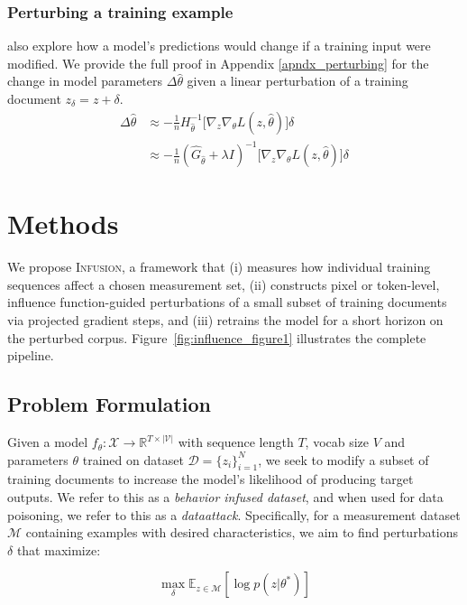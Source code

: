 \documentclass{article}
\theoremstyle{plain}
\theoremstyle{definition}
\theoremstyle{remark}
\begin{document}
\subsubsection{Perturbing a training example}
\citet{koh2017understanding} also explore how a model's predictions would change if a training input were modified. We provide the full proof in Appendix \ref{apndx_perturbing} for the change in model parameters $\Delta \hat \theta$ given a linear perturbation of a training document $z_\delta = z + \delta $.
\begin{align}
\Delta\hat\theta &\approx -\frac{1}{n} H_{\hat{\theta}}^{-1} \big[ \nabla_z \nabla_\theta L(z, \hat\theta)\big]\delta \\
&\approx -\frac{1}{n} (\hat G_{\hat\theta} + \lambda I)^{-1} \big[ \nabla_z \nabla_\theta L(z, \hat\theta)\big]\delta
\label{eq:pert}
\end{align}



\section{Methods}

We propose \textsc{Infusion}, a framework that (i) measures how individual training sequences affect a chosen measurement set, (ii) constructs pixel or token-level, influence function-guided perturbations of a small subset of training documents via projected gradient steps, and (iii) retrains the model for a short horizon on the perturbed corpus. Figure~\ref{fig:influence_figure1} illustrates the complete pipeline.


\subsection{Problem Formulation}

Given a model $f_\theta: \mathcal{X} \rightarrow \mathbb{R}^{T \times |\mathcal{V}|}$ with sequence length $T$, vocab size $V$ and parameters $\theta$ trained on dataset $\mathcal{D} = \{z_i\}_{i=1}^N$, we seek to modify a subset of training documents to increase the model's likelihood of producing target outputs. We refer to this as a \textit{behavior infused dataset}, and when used for data poisoning, we refer to this as a \textit{data\textc attack}. Specifically, for a measurement dataset $\mathcal{M}$ containing examples with desired characteristics, we aim to find perturbations $\delta$ that maximize:

\begin{equation}
\max_{\delta} \mathbb{E}_{z \in \mathcal{M}} \left[ \log p(z | \theta^*) \right]
\end{equation}
\end{document}
